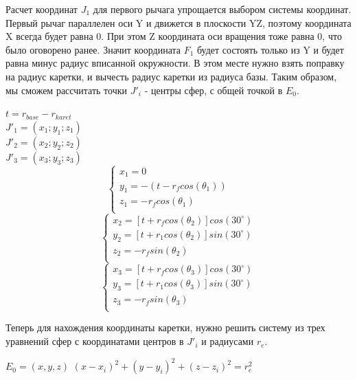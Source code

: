 Расчет координат $J_{1}$ для первого рычага упрощается выбором системы координат. Первый рычаг параллелен оси Y и движется в плоскости YZ, поэтому координата X всегда будет равна 0. При этом Z координата оси вращения тоже равна 0, что было оговорено ранее. Значит координата $F_{1}$ будет состоять только из Y  и будет равна минус радиус вписанной окружности. В этом месте нужно взять поправку на радиус каретки, и вычесть радиус каретки из радиуса базы. Таким образом, мы сможем рассчитать точки  $J'_{i}$ - центры сфер, с общей точкой в $E_{0}$. 
\begin{center}
$t = r_{base} - r_{karet}$\\
$J'_{1} = (x_{1};y_{1};z_{1})$\\
$J'_{2} = (x_{2};y_{2};z_{2})$\\
$J'_{3} = (x_{3};y_{3};z_{3})$\\
\begin{equation*}
 \begin{cases}
        x_{1} = 0 \\
        y_{1} = -(t - r_{f}cos(\theta_{1})) \qquad\\
        z_{1} = -r_{f}cos(\theta_{1})\\
    \end{cases}
\end{equation*}
\begin{equation*}
    \begin{cases}
        x_{2} = [t+r_{f}cos(\theta_{2})]cos(30^{\circ})\\
        y_{2} = [t+r_{1}cos(\theta_{2})]sin(30^{\circ})\\
        z_{2} = -r_{f}sin(\theta_{2})\\
    \end{cases}    
\end{equation*}
\begin{equation*}
    \begin{cases}
        x_{3} = [t+r_{f}cos(\theta_{3})]cos(30^{\circ})\\
        y_{3} = [t+r_{1}cos(\theta_{3})]sin(30^{\circ})\\
        z_{3} = -r_{f}sin(\theta_{3})\\
    \end{cases}    
\end{equation*}
\end{center}

Теперь для нахождения координаты каретки, нужно решить систему из трех уравнений сфер с координатами центров в $J'_{i}$ и радиусами $r_e$.
\begin{center}
    $E_{0} = (x,y,z)$
    $( x - x_{i} )^{2} + ( y - y_{i} )^{2} + ( z - z_{i} )^{2} = r^{2}_{e} $
\end{center}

